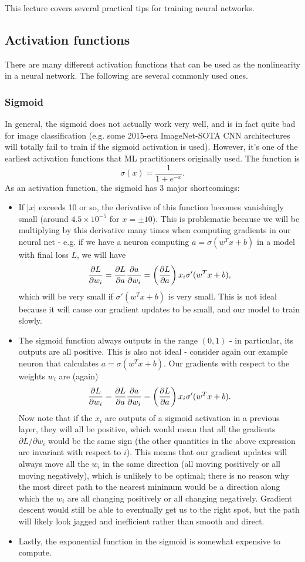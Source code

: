This lecture covers several practical tips for training neural networks.

\subsection{Activation functions}
There are many different activation functions that can be used as the nonlinearity in a neural network. The following are several commonly used ones.
\subsubsection{Sigmoid}
In general, the sigmoid does not actually work very well, and is in fact quite bad for image classification (e.g. some 2015-era ImageNet-SOTA CNN architectures will totally fail to train if the sigmoid activation is used). However, it's one of the earliest activation functions that ML practitioners originally used. The function is
$$\sigma (x) = \frac{1}{1 + e^{-x}}.$$
As an activation function, the sigmoid has 3 major shortcomings:
\begin{itemize}
\item If $|x|$ exceeds 10 or so, the derivative of this function becomes vanishingly small (around $4.5 \times 10^{-5}$ for $x = \pm 10$). This is problematic because we will be multiplying by this derivative many times when computing gradients in our neural net - e.g. if we have a neuron computing $a = \sigma(w^Tx + b)$ in a model with final loss $L$, we will have
$$\frac{\partial L}{\partial w_i} = \frac{\partial L}{\partial a} \frac{\partial a}{\partial w_i} = \left(\frac{\partial L}{\partial a}\right)x_i\sigma'(w^Tx + b),$$
which will be very small if $\sigma'(w^Tx + b)$ is very small. This is not ideal because it will cause our gradient updates to be small, and our model to train slowly.
\item The sigmoid function always outputs in the range $(0, 1)$ - in particular, its outputs are all positive. This is also not ideal - consider again our example neuron that calculates $a = \sigma(w^Tx + b)$. Our gradients with respect to the weights $w_i$ are (again)
$$\frac{\partial L}{\partial w_i} = \frac{\partial L}{\partial a} \frac{\partial a}{\partial w_i} = \left(\frac{\partial L}{\partial a}\right)x_i\sigma'(w^Tx + b).$$
Now note that if the $x_i$ are outputs of a sigmoid activation in a previous layer, they will all be positive, which would mean that all the gradients $\partial L/\partial w_i$ would be the same sign (the other quantities in the above expression are invariant with respect to $i$). This means that our gradient updates will always move all the $w_i$ in the same direction (all moving positively or all moving negatively), which is unlikely to be optimal; there is no reason why the most direct path to the nearest minimum would be a direction along which the $w_i$ are all changing positively or all changing negatively. Gradient descent would still be able to eventually get us to the right spot, but the path will likely look jagged and inefficient rather than smooth and direct.
\item Lastly, the exponential function in the sigmoid is somewhat expensive to compute.
\end{itemize}
